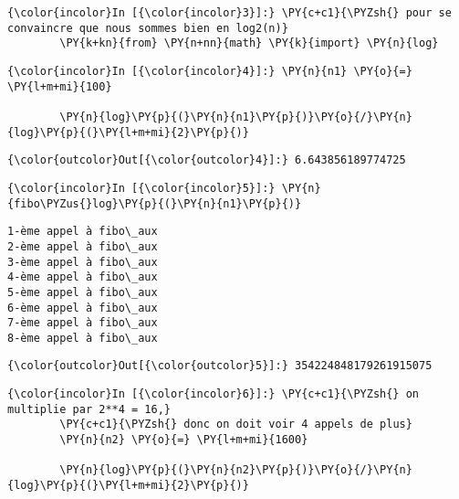     \begin{Verbatim}[commandchars=\\\{\},frame=single,framerule=0.3mm,rulecolor=\color{cellframecolor}]
{\color{incolor}In [{\color{incolor}3}]:} \PY{c+c1}{\PYZsh{} pour se convaincre que nous sommes bien en log2(n)}
        \PY{k+kn}{from} \PY{n+nn}{math} \PY{k}{import} \PY{n}{log}
\end{Verbatim}


    \begin{Verbatim}[commandchars=\\\{\},frame=single,framerule=0.3mm,rulecolor=\color{cellframecolor}]
{\color{incolor}In [{\color{incolor}4}]:} \PY{n}{n1} \PY{o}{=} \PY{l+m+mi}{100}
        
        \PY{n}{log}\PY{p}{(}\PY{n}{n1}\PY{p}{)}\PY{o}{/}\PY{n}{log}\PY{p}{(}\PY{l+m+mi}{2}\PY{p}{)}
\end{Verbatim}


\begin{Verbatim}[commandchars=\\\{\},frame=single,framerule=0.3mm,rulecolor=\color{cellframecolor}]
{\color{outcolor}Out[{\color{outcolor}4}]:} 6.643856189774725
\end{Verbatim}
            
    \begin{Verbatim}[commandchars=\\\{\},frame=single,framerule=0.3mm,rulecolor=\color{cellframecolor}]
{\color{incolor}In [{\color{incolor}5}]:} \PY{n}{fibo\PYZus{}log}\PY{p}{(}\PY{n}{n1}\PY{p}{)}
\end{Verbatim}


    \begin{Verbatim}[commandchars=\\\{\},frame=single,framerule=0.3mm,rulecolor=\color{cellframecolor}]
1-ème appel à fibo\_aux
2-ème appel à fibo\_aux
3-ème appel à fibo\_aux
4-ème appel à fibo\_aux
5-ème appel à fibo\_aux
6-ème appel à fibo\_aux
7-ème appel à fibo\_aux
8-ème appel à fibo\_aux
\end{Verbatim}

\begin{Verbatim}[commandchars=\\\{\},frame=single,framerule=0.3mm,rulecolor=\color{cellframecolor}]
{\color{outcolor}Out[{\color{outcolor}5}]:} 354224848179261915075
\end{Verbatim}
            
    \begin{Verbatim}[commandchars=\\\{\},frame=single,framerule=0.3mm,rulecolor=\color{cellframecolor}]
{\color{incolor}In [{\color{incolor}6}]:} \PY{c+c1}{\PYZsh{} on multiplie par 2**4 = 16,}
        \PY{c+c1}{\PYZsh{} donc on doit voir 4 appels de plus}
        \PY{n}{n2} \PY{o}{=} \PY{l+m+mi}{1600}
        
        \PY{n}{log}\PY{p}{(}\PY{n}{n2}\PY{p}{)}\PY{o}{/}\PY{n}{log}\PY{p}{(}\PY{l+m+mi}{2}\PY{p}{)}
\end{Verbatim}


